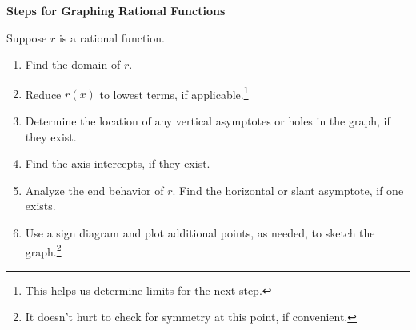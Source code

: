 \documentclass{ximera}
\begin{document}
\colorbox{ResultColor}{\bbm

\centerline{\textbf{Steps for Graphing Rational Functions}}

\medskip

\hspace{.17in} Suppose $r$ is a rational function. 

\begin{enumerate}

\item  Find the domain of $r$.

\item  Reduce $r(x)$ to lowest terms, if applicable.\footnote{This helps us determine limits for the next step.}

\item  Determine the location of any vertical asymptotes or holes in the graph, if they exist. 

\item  Find the axis intercepts, if they exist.

\item  Analyze the end behavior of $r$.  Find the horizontal or slant asymptote, if one exists.

\item  Use a sign diagram and plot additional points, as needed, to sketch the graph.\footnote{It doesn't hurt to check for symmetry at this point, if convenient.}

\end{enumerate}

\ebm}

\bigskip
\end{document}
